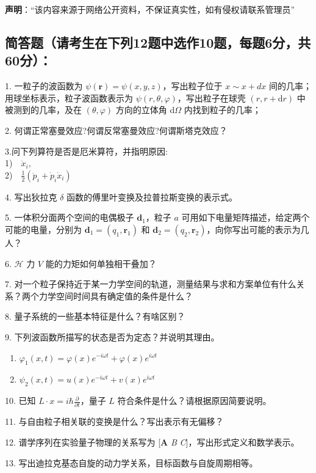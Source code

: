 
\textbf{声明}：“该内容来源于网络公开资料，不保证真实性，如有侵权请联系管理员”

\subsection{简答题（请考生在下列12题中选作10题，每题6分，共60分）：}

1. 一粒子的波函数为 $\psi (\mathbf{r}) = \psi (x, y, z)$，写出粒子位于 $x \sim x + d x$ 间的几率；用球坐标表示，粒子波函数表示为 $\psi (r, \theta, \varphi)$，写出粒子在球壳 $(r, r + \mathrm{d}r)$ 中被测到的几率，及在 $(\theta, \varphi)$ 方向的立体角 $\mathrm{d}\Omega$ 内找到粒子的几率；

2. 何谓正常塞曼效应?何谓反常塞曼效应?何谓斯塔克效应？

3.问下列算符是否是厄米算符，并指明原因:\\
1)$\quad \ddot{x}_i,$\\ 2)$\quad \frac{1}{2}(\ddot{p}_i + \dot{p}_i \dot{x}_i)$

4. 写出狄拉克 $\delta$ 函数的傅里叶变换及拉普拉斯变换的表示式。

5. 一体积分面两个空间的电偶极子 $ \mathbf{d}_1$，粒子 $a$ 可用如下电量矩阵描述，给定两个可能的电量，分别为 $\mathbf{d}_1 = (q_1, \mathbf{r}_1)$ 和 $\mathbf{d}_2 = (q_2, \mathbf{r}_2)$，向你写出可能的表示为几人？

6. $\mathcal{H}$ 力 $V$ 能的力矩如何单独相干叠加？

7. 对一个粒子保持近于某一力学空间的轨道，测量结果与求和方案单位有什么关系？两个力学空间时间具有确定值的条件是什么？

8. 量子系统的一些基本特征是什么？有啥区别？

9. 下列波函数所描写的状态是否为定态？并说明其理由。

\begin{enumerate}
  \item $\varphi_1 (x, t) = \varphi (x) e^{-i \omega t} + \varphi (x) e^{i \omega t}$
  \item $\psi_2 (x, t) = u (x) e^{-i \omega t} + v (x) e^{i \omega t}$
\end{enumerate}

10. 已知 $L \cdot x = i \hbar \frac{\partial}{\partial t}$，量子 $L$ 符合条件是什么？请根据原因简要说明。

11. 与自由粒子相关联的变换是什么？写出表示有无偏移？

12. 谱学序列在实验量子物理的关系写为 [\textbf{A} \textit{B} \textit{C}]，写出形式定义和数学表示。

13. 写出迪拉克基态自旋的动力学关系，目标函数与自旋周期相等。
